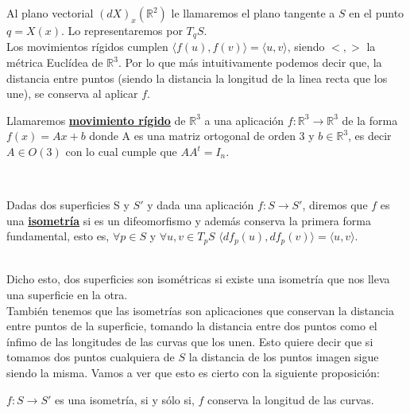 Al plano vectorial $(dX)_x(\mathbb{R}^2)$ le llamaremos el plano tangente a $S$ en el punto $q = X(x)$. Lo representaremos por $T_q S$.
${ }$\\

Los movimientos rígidos cumplen $\langle f(u), f(v) \rangle = \langle u, v \rangle$, siendo $<,>$ la métrica Euclídea de $\mathbb{R}^3$. Por lo que más intuitivamente podemos decir que, la distancia entre puntos (siendo la distancia la longitud de la linea recta que los une), se conserva al aplicar $f$.
${ }$\\

\begin{definicion}
	Llamaremos \underline{\textbf{movimiento rígido}} de $\mathbb{R}^3$ a una aplicación $f : \mathbb{R}^3 \to \mathbb{R}^3$ de la forma $f(x) = Ax + b$ donde A es una matriz ortogonal de orden 3 y $b \in \mathbb{R}^3$, es decir $A \in O(3)$ con lo cual cumple que $AA^{t} = I_{n}$.
\end{definicion}
${ }$\\


\begin{definicion}\label{def:isom} %
	Dadas dos superficies S y $S'$ y dada una aplicación $f : S \longrightarrow S'$, diremos que $f$ es una \underline{\textbf{isometría}} si es un difeomorfismo y además conserva la primera forma fundamental, esto es, $\forall p \in S$ y $\forall u,v \in T_p S$ $\langle df_p(u), df_p(v)\rangle = \langle u, v\rangle$.
\end{definicion}
${ }$\\

Dicho esto, dos superficies son isométricas si existe una isometría que nos lleva una superficie en la otra.
	${}$\\
	
También tenemos que las isometrías son aplicaciones que conservan la distancia entre puntos de la superficie, tomando la distancia entre dos puntos como el ínfimo de las longitudes de las curvas que los unen. Esto quiere decir que si tomamos dos puntos cualquiera de $S$ la distancia de los puntos imagen sigue siendo la misma. Vamos a ver que esto es cierto con la siguiente proposición:
${ }$\\

\begin{proposicion}
	$f : S \to S'$ es una isometría, si y sólo si, $f$ conserva la longitud de las curvas.
\end{proposicion}

